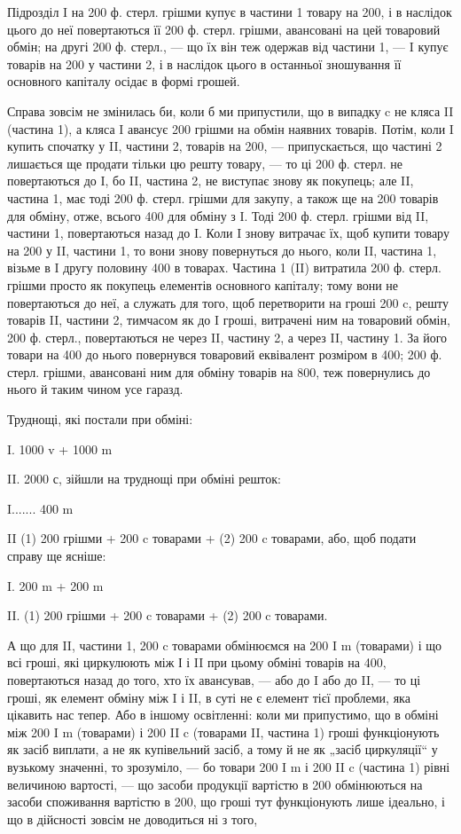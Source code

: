 Підрозділ I на 200 ф. стерл. грішми купує в частини 1 товару на
200, і в наслідок цього до неї повертаються її 200 ф. стерл. грішми,
авансовані на цей товаровий обмін; на другі 200 ф. стерл., — що їх він
теж одержав від частини 1, — I купує товарів на 200 у частини 2, і в
наслідок цього в останньої зношування її основного капіталу осідає в
формі грошей.

Справа зовсім не змінилась би, коли б ми припустили, що в випадку
c не кляса II (частина 1), а кляса I авансує 200 грішми на обмін наявних
товарів. Потім, коли I купить спочатку у II, частини 2, товарів на
200, — припускається, що частині 2 лишається ще продати тільки цю
решту товару, — то ці 200 ф. стерл. не повертаються до I, бо II, частина
2, не виступає знову як покупець; але II, частина 1, має тоді 200 ф. стерл.
грішми для закупу, а також ще на 200 товарів для обміну, отже, всього
400 для обміну з I. Тоді 200 ф. стерл. грішми від    II, частини 1, повертаються
назад до I. Коли I знову витрачає їх, щоб купити    товару на
200 у II, частини 1, то вони знову повернуться до нього, коли II,
частина 1, візьме в I другу половину 400 в товарах. Частина 1 (II)
витратила 200 ф. стерл. грішми просто як покупець елементів основного
капіталу; тому вони не повертаються до неї, а служать для того,
щоб перетворити на гроші 200 c, решту товарів II, частини 2, тимчасом
як до I гроші, витрачені ним на товаровий обмін, 200 ф. стерл., повертаються
не через II, частину 2, а через II, частину 1. За його товари
на 400 до нього повернувся товаровий еквівалент розміром в 400;
200 ф. стерл. грішми, авансовані ним для обміну товарів на 800, теж
повернулись до нього й таким чином усе гаразд.

Труднощі, які постали при обміні:

I.    1000 v + 1000 m

II.    2000 с, зійшли на труднощі при обміні решток:

I....... 400 m

II (1) 200 грішми + 200 c товарами + (2) 200 c товарами, або, щоб
подати справу ще ясніше:

I.    200 m + 200 m

II. (1) 200 грішми + 200 c товарами + (2) 200 c товарами.

А що для II, частини 1, 200 c товарами обмінюємся на 200 I m
(товарами) і що всі гроші, які циркулюють між І і II при цьому обміні
товарів на 400, повертаються назад до того, хто їх авансував, — або до
I або до II, — то ці гроші, як елемент обміну між I і II, в суті не є
елемент тієї проблеми, яка цікавить нас тепер. Або в іншому освітленні:
коли ми припустимо, що в обміні між 200 I m (товарами) і 200 II c
(товарами II, частина 1) гроші функціонують як засіб виплати, а не як
купівельний засіб, а тому й не як „засіб циркуляції“ у вузькому значенні,
то зрозуміло, — бо товари 200 I m і 200 II c (частина 1)
рівні величиною вартості, — що засоби продукції вартістю в 200 обмінюються
на засоби споживання вартістю в 200, що гроші тут функціонують
лише ідеально, і що в дійсності зовсім не доводиться ні з того,
